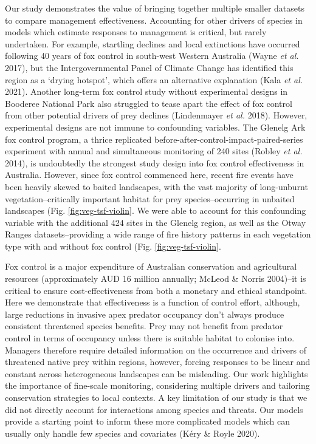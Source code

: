 \documentclass[11pt,a4paper,titlepage,twoside,openright]{style/unimelbthesis}
\begin{document}
\begin{mainmatter}
Our study demonstrates the value of bringing together multiple smaller datasets to compare management effectiveness. Accounting for other drivers of species in models which estimate responses to management is critical, but rarely undertaken. For example, startling declines and local extinctions have occurred following 40 years of fox control in south-west Western Australia (Wayne \emph{et al.} 2017), but the Intergovernmental Panel of Climate Change has identified this region as a `drying hotspot', which offers an alternative explanation (Kala \emph{et al.} 2021). Another long-term fox control study without experimental designs in Booderee National Park also struggled to tease apart the effect of fox control from other potential drivers of prey declines (Lindenmayer \emph{et al.} 2018). However, experimental designs are not immune to confounding variables. The Glenelg Ark fox control program, a thrice replicated before-after-control-impact-paired-series experiment with annual and simultaneous monitoring of 240 sites (Robley \emph{et al.} 2014), is undoubtedly the strongest study design into fox control effectiveness in Australia. However, since fox control commenced here, recent fire events have been heavily skewed to baited landscapes, with the vast majority of long-unburnt vegetation--critically important habitat for prey species--occurring in unbaited landscapes (Fig. \ref{fig:veg-tsf-violin}. We were able to account for this confounding variable with the additional 424 sites in the Glenelg region, as well as the Otway Ranges datasets--providing a wide range of fire history patterns in each vegetation type with and without fox control (Fig. \ref{fig:veg-tsf-violin}.

Fox control is a major expenditure of Australian conservation and agricultural resources (approximately AUD 16 million annually; McLeod \& Norris 2004)--it is critical to ensure cost-effectiveness from both a monetary and ethical standpoint. Here we demonstrate that effectiveness is a function of control effort, although, large reductions in invasive apex predator occupancy don't always produce consistent threatened species benefits. Prey may not benefit from predator control in terms of occupancy unless there is suitable habitat to colonise into. Managers therefore require detailed information on the occurrence and drivers of threatened native prey within regions, however, forcing responses to be linear and constant across heterogeneous landscapes can be misleading. Our work highlights the importance of fine-scale monitoring, considering multiple drivers and tailoring conservation strategies to local contexts. A key limitation of our study is that we did not directly account for interactions among species and threats. Our models provide a starting point to inform these more complicated models which can usually only handle few species and covariates (Kéry \& Royle 2020).


\end{mainmatter}
\end{document}
